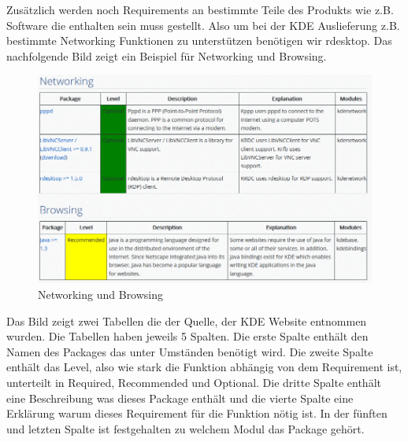 Zusätzlich werden noch Requirements an bestimmte Teile des Produkts wie z.B.
Software die enthalten sein muss gestellt. Also um bei der KDE Auslieferung z.B.
bestimmte Networking Funktionen zu unterstützen benötigen wir rdesktop. Das
nachfolgende Bild zeigt ein Beispiel für Networking und Browsing.
\begin{figure}[h]
\includegraphics[width=\columnwidth]{images/KDE_Net_B.png}
\caption{Networking und Browsing\cite{6}}
\end{figure}
Das Bild zeigt zwei Tabellen die der Quelle, der KDE
Website entnommen wurden\cite{6}.
Die Tabellen haben jeweils 5 Spalten. Die erste Spalte enthält den Namen des
Packages das unter Umständen benötigt wird. Die zweite Spalte enthält das Level,
also wie stark die Funktion abhängig von dem Requirement ist, unterteilt in
Required, Recommended und Optional. Die dritte Spalte enthält eine Beschreibung
was dieses Package enthält und die vierte Spalte eine Erklärung warum dieses
Requirement für die Funktion nötig ist. In der fünften und letzten Spalte ist
festgehalten zu welchem Modul das Package gehört.

